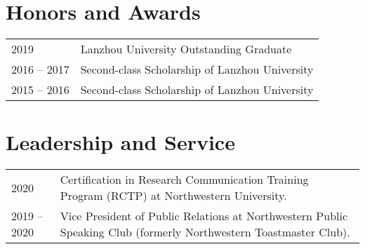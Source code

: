 \documentclass[margin,line,pifont,palatino,courier]{res}
\begin{document}
\begin{resume}
%		

		\section{\sc Honors and Awards}
		\vspace*{.02in}
		\begin{tabular}{@{}p{0.8in}p{4in}}
			2019 & Lanzhou University Outstanding Graduate \\
			2016 -- 2017 & Second-class Scholarship of Lanzhou University \\
			2015 -- 2016 & Second-class Scholarship of Lanzhou University \\
		\end{tabular}
		

		\section{\sc Leadership and Service}
		\vspace*{.02in}
		\begin{tabular}{@{}p{0.8in}p{4in}}
			2020 & Certification in Research Communication Training Program (RCTP) at Northwestern University. \vspace*{.1in} \\
			2019 -- 2020 & Vice President of Public Relations at Northwestern Public Speaking Club (formerly Northwestern Toastmaster Club).
		\end{tabular}
		


\end{resume}
\end{document}
